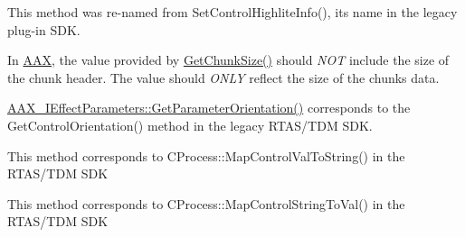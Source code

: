 \begin{DoxyRefList}
%
 This method was re-\/named from {\ttfamily Set\+Control\+Highlite\+Info()}, its name in the legacy plug-\/in S\+DK. 
\item[Member \mbox{\hyperlink{a01669_aa986711cd372febcaae803e86ae08f63}{A\+A\+X\+\_\+\+I\+A\+C\+F\+Effect\+Parameters::Get\+Chunk\+Size}} (A\+A\+X\+\_\+\+C\+Type\+ID i\+Chunk\+ID, uint32\+\_\+t $\ast$o\+Size) const =0]\label{a00787__porting_notes000035}%
%
 In \mbox{\hyperlink{a00852}{A\+AX}}, the value provided by \mbox{\hyperlink{a01669_aa986711cd372febcaae803e86ae08f63}{Get\+Chunk\+Size()}} should {\itshape N\+OT} include the size of the chunk header. The value should {\itshape O\+N\+LY} reflect the size of the chunk\textquotesingle{}s data. 
\item[Member \mbox{\hyperlink{a01669_ac122e1a693296b059dca4350a5ff1dfe}{A\+A\+X\+\_\+\+I\+A\+C\+F\+Effect\+Parameters::Get\+Parameter\+Orientation}} (A\+A\+X\+\_\+\+C\+Param\+ID i\+Parameter\+ID, A\+A\+X\+\_\+\+E\+Parameter\+Orientation $\ast$o\+Parameter\+Orientation) const =0]\label{a00787__porting_notes000032}%
%
 \mbox{\hyperlink{a01669_ac122e1a693296b059dca4350a5ff1dfe}{A\+A\+X\+\_\+\+I\+Effect\+Parameters\+::\+Get\+Parameter\+Orientation()}} corresponds to the Get\+Control\+Orientation() method in the legacy R\+T\+A\+S/\+T\+DM S\+DK. 
\item[Member \mbox{\hyperlink{a01669_add995f2eb5a3967c48dd9f3e21f003aa}{A\+A\+X\+\_\+\+I\+A\+C\+F\+Effect\+Parameters::Get\+Parameter\+String\+From\+Value}} (A\+A\+X\+\_\+\+C\+Param\+ID i\+Parameter\+ID, double i\+Value, \mbox{\hyperlink{a01873}{A\+A\+X\+\_\+\+I\+String}} $\ast$o\+Value\+String, int32\+\_\+t i\+Max\+Length) const =0]\label{a00787__porting_notes000034}%
%
 This method corresponds to C\+Process\+::\+Map\+Control\+Val\+To\+String() in the R\+T\+A\+S/\+T\+DM S\+DK 
\item[Member \mbox{\hyperlink{a01669_a54bb12c9798e4f9a3a5b5d6f30ace992}{A\+A\+X\+\_\+\+I\+A\+C\+F\+Effect\+Parameters::Get\+Parameter\+Value\+From\+String}} (A\+A\+X\+\_\+\+C\+Param\+ID i\+Parameter\+ID, double $\ast$o\+Value, const \mbox{\hyperlink{a01873}{A\+A\+X\+\_\+\+I\+String}} \&i\+Value\+String) const =0]\label{a00787__porting_notes000033}%
%
 This method corresponds to C\+Process\+::\+Map\+Control\+String\+To\+Val() in the R\+T\+A\+S/\+T\+DM S\+DK 
\item[Class \mbox{\hyperlink{a01693}{A\+A\+X\+\_\+\+I\+A\+C\+F\+Host\+Processor}} ]\label{a00787__porting_notes000036}%

\end{DoxyRefList}
